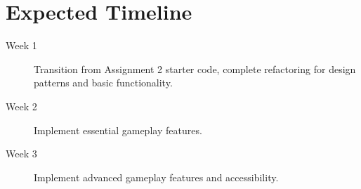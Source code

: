 \documentclass{article}
\begin{document}
\clearpage

\section{Expected Timeline}

\begin{description}
\item[Week 1] Transition from Assignment 2 starter code, complete refactoring for design patterns and basic functionality.
\item[Week 2] Implement essential gameplay features.
\item[Week 3] Implement advanced gameplay features and accessibility.
\end{description}
\end{document}
